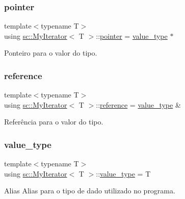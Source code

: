 \subsubsection{\texorpdfstring{pointer}{pointer}}
{\footnotesize\ttfamily template$<$typename T$>$ \\
using \hyperlink{classsc_1_1MyIterator}{sc\+::\+My\+Iterator}$<$ T $>$\+::\hyperlink{classsc_1_1MyIterator_aac55734d4d00af05ed90556dd8f8df0b}{pointer} =  \hyperlink{classsc_1_1MyIterator_a87259a3ccf8ff488d496b658324c4b2d}{value\+\_\+type} $\ast$}



Ponteiro para o valor do tipo. 

\mbox{\label{classsc_1_1MyIterator_a713949524e31c23eade8ea3521c938ef}} 
\subsubsection{\texorpdfstring{reference}{reference}}
{\footnotesize\ttfamily template$<$typename T$>$ \\
using \hyperlink{classsc_1_1MyIterator}{sc\+::\+My\+Iterator}$<$ T $>$\+::\hyperlink{classsc_1_1MyIterator_a713949524e31c23eade8ea3521c938ef}{reference} =  \hyperlink{classsc_1_1MyIterator_a87259a3ccf8ff488d496b658324c4b2d}{value\+\_\+type} \&}



Referência para o valor do tipo. 

\mbox{\label{classsc_1_1MyIterator_a87259a3ccf8ff488d496b658324c4b2d}} 
\subsubsection{\texorpdfstring{value\+\_\+type}{value\_type}}
{\footnotesize\ttfamily template$<$typename T$>$ \\
using \hyperlink{classsc_1_1MyIterator}{sc\+::\+My\+Iterator}$<$ T $>$\+::\hyperlink{classsc_1_1MyIterator_a87259a3ccf8ff488d496b658324c4b2d}{value\+\_\+type} =  T}

Alias Alias para o tipo de dado utilizado no programa. 

